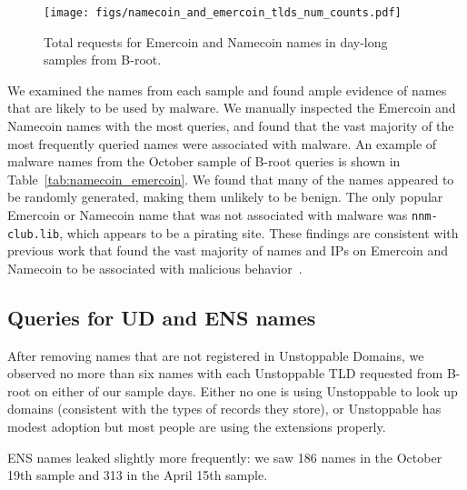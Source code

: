 \begin{figure}[t]
	\centering
	\texttt{[image: figs/namecoin\_and\_emercoin\_tlds\_num\_counts.pdf]}
	\caption{Total requests for Emercoin and Namecoin names in day-long samples 
		from B-root.}
	\label{fig:namecoin_and_emercoin_counts}
\end{figure}

We examined the names from each sample 
and found ample evidence of names that are likely to be used by malware. We 
manually inspected 
the Emercoin and Namecoin names with the most queries, and found that the vast 
majority of the most 
frequently queried names were associated with malware. An example of malware 
names from the October 
sample of B-root queries is shown in Table~\ref{tab:namecoin_emercoin}. We 
found that many of the 
names appeared to be randomly generated, making them unlikely to be benign. 
 The only popular Emercoin 
or Namecoin name that was not associated with malware was 
\texttt{nnm-club.lib}, which appears to be a 
pirating site. These findings are consistent with previous work that found the 
vast majority of names 
and IPs on Emercoin and Namecoin to be associated with malicious 
behavior~\cite{patsakis_unravelling_2020, casino_unearthing_2021}. 

\subsection{Queries for UD and ENS names}

	

After removing names that are not registered in Unstoppable Domains, we 
observed no more than six names with each Unstoppable TLD requested from B-root 
on either of our sample days. Either no one is using Unstoppable to look up 
domains (consistent with the types of records they store), or Unstoppable has 
modest adoption but most people are using the extensions properly.

ENS names leaked slightly more frequently: we saw 186 names in the October 19th
sample and 313 in the April 15th sample.
	
